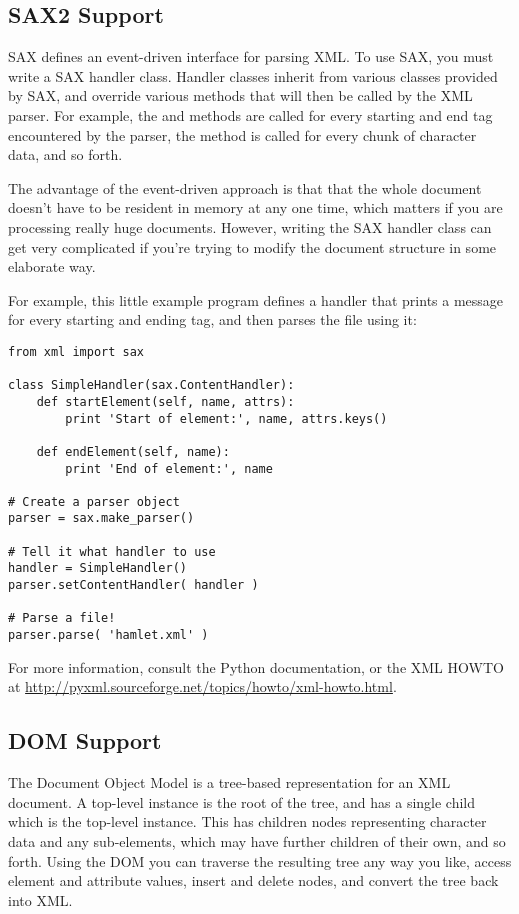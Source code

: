\documentclass{howto}
\begin{document}
\subsection{SAX2 Support}

SAX defines an event-driven interface for parsing XML.  To use SAX,
you must write a SAX handler class.  Handler classes inherit from
various classes provided by SAX, and override various methods that
will then be called by the XML parser.  For example, the
 and  methods are called for
every starting and end tag encountered by the parser, the
 method is called for every chunk of character
data, and so forth.

The advantage of the event-driven approach is that that the whole
document doesn't have to be resident in memory at any one time, which
matters if you are processing really huge documents.  However, writing
the SAX handler class can get very complicated if you're trying to
modify the document structure in some elaborate way.

For example, this little example program defines a handler that prints
a message for every starting and ending tag, and then parses the file
 using it:

\begin{verbatim}
from xml import sax

class SimpleHandler(sax.ContentHandler):
    def startElement(self, name, attrs):
        print 'Start of element:', name, attrs.keys()

    def endElement(self, name):
        print 'End of element:', name

# Create a parser object
parser = sax.make_parser()

# Tell it what handler to use
handler = SimpleHandler()
parser.setContentHandler( handler )

# Parse a file!
parser.parse( 'hamlet.xml' )
\end{verbatim}

For more information, consult the Python documentation, or the XML
HOWTO at \url{http://pyxml.sourceforge.net/topics/howto/xml-howto.html}.

\subsection{DOM Support}

The Document Object Model is a tree-based representation for an XML
document.  A top-level  instance is the root of the
tree, and has a single child which is the top-level 
instance. This  has children nodes representing
character data and any sub-elements, which may have further children
of their own, and so forth.  Using the DOM you can traverse the
resulting tree any way you like, access element and attribute values,
insert and delete nodes, and convert the tree back into XML.
\end{document}
